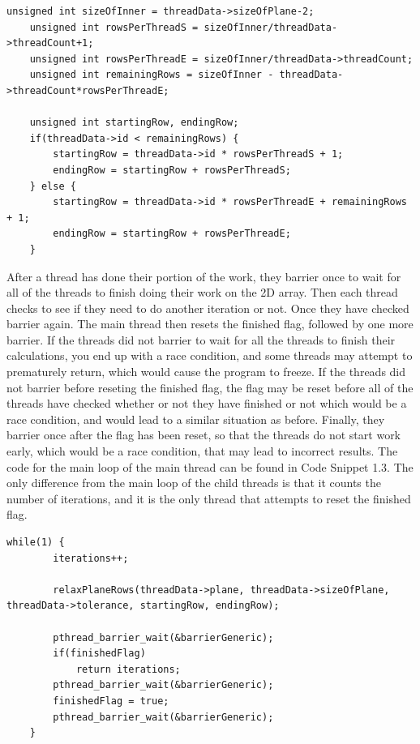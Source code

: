 \documentclass{report}
\begin{document}
\begin{lstlisting}[style=customc,caption=Row Split Logic]
    unsigned int sizeOfInner = threadData->sizeOfPlane-2;
    unsigned int rowsPerThreadS = sizeOfInner/threadData->threadCount+1;
    unsigned int rowsPerThreadE = sizeOfInner/threadData->threadCount;
    unsigned int remainingRows = sizeOfInner - threadData->threadCount*rowsPerThreadE;

    unsigned int startingRow, endingRow;
    if(threadData->id < remainingRows) {
        startingRow = threadData->id * rowsPerThreadS + 1;
        endingRow = startingRow + rowsPerThreadS;
    } else {
        startingRow = threadData->id * rowsPerThreadE + remainingRows + 1;
        endingRow = startingRow + rowsPerThreadE;
    }
\end{lstlisting}
After a thread has done their portion of the work, they barrier once to wait for all of the threads to finish doing their work on the 2D array. Then each thread checks to see if they need to do another iteration or not. Once they have checked barrier again. The main thread then resets the finished flag, followed by one more barrier. If the threads did not barrier to wait for all the threads to finish their calculations, you end up with a race condition, and some threads may attempt to prematurely return, which would cause the program to freeze. If the threads did not barrier before reseting the finished flag, the flag may be reset before all of the threads have checked whether or not they have finished or not which would be a race condition, and would lead to a similar situation as before. Finally, they barrier once after the flag has been reset, so that the threads do not start work early, which would be a race condition, that may lead to incorrect results. The code for the main loop of the main thread can be found in Code Snippet 1.3. The only difference from the main loop of the child threads is that it counts the number of iterations, and it is the only thread that attempts to reset the finished flag.
\begin{lstlisting}[style=customc,caption=Version 1 Parallel Main Loop]
    while(1) {
        iterations++;

        relaxPlaneRows(threadData->plane, threadData->sizeOfPlane, threadData->tolerance, startingRow, endingRow);

        pthread_barrier_wait(&barrierGeneric);
        if(finishedFlag)
            return iterations;
        pthread_barrier_wait(&barrierGeneric);
        finishedFlag = true;
        pthread_barrier_wait(&barrierGeneric);
    }
\end{lstlisting}
\end{document}
